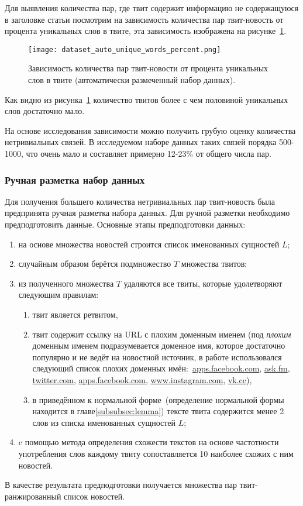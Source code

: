        Для выявления количества пар, где твит содержит информацию не содержащуюся в заголовке статьи посмотрим на зависимость количества пар твит-новость от процента уникальных слов в твите,
        эта зависимость изображена на рисунке~\ref{pic:auto_percent}.
        \begin{figure}[h!]
            \center
            \texttt{[image: dataset\_auto\_unique\_words\_percent.png]}
            \caption{Зависимость количества пар твит-новости от процента уникальных слов в твите (автоматически размеченный набор данных).}
            \label{pic:auto_percent}
        \end{figure}
        Как видно из рисунка~\ref{pic:auto_percent} количество твитов более с чем половиной уникальных слов достаточно мало.

        На основе исследования зависимости можно получить грубую оценку количества нетривиальных связей.
        В исследуемом наборе данных таких связей порядка 500-1000, что очень мало и составляет примерно 12-23\% от общего числа пар.

    \subsubsection{Ручная разметка набор данных}
        Для получения большего количества нетривиальных пар твит-новость была предпринята ручная разметка набора данных.
        Для ручной разметки необходимо предподготовить данные. Основные этапы предподготовки данных:
        \begin{enumerate}
            \item на основе множества новостей строится список именованных сущностей $L$;
            \item случайным образом берётся подмножество $T$ множества твитов;
            \item из полученного множества $T$ удаляются все твиты, которые удолетворяют следующим правилам:
            \begin{enumerate}
                \item твит является ретвитом,
                \item твит содержит ссылку на URL с плохим доменным именем (под \textit{плохим} доменным именем подразумевается доменное имя,
                которое достаточно популярно и не ведёт на новостной источник, в работе использовался следующий список плохих доменных имён:\
                \url{apps.facebook.com}, \url{ask.fm}, \url{twitter.com}, \url{apps.facebook.com}, \url{www.instagram.com}, \url{vk.cc}),
                \item в приведённом к нормальной форме~(определение нормальной формы находится в главе\ref{subsubsec:lemma}) тексте твита содержится менее 2 слов из списка именованных сущностей $L$;
            \end{enumerate}
            \item c помощью метода определения схожести текстов на основе частотности употребления слов каждому твиту сопоставляется 10 наиболее схожих с ним новостей.
        \end{enumerate}
        В качестве результата предподготовки получается множества пар твит-ранжированный список новостей.

